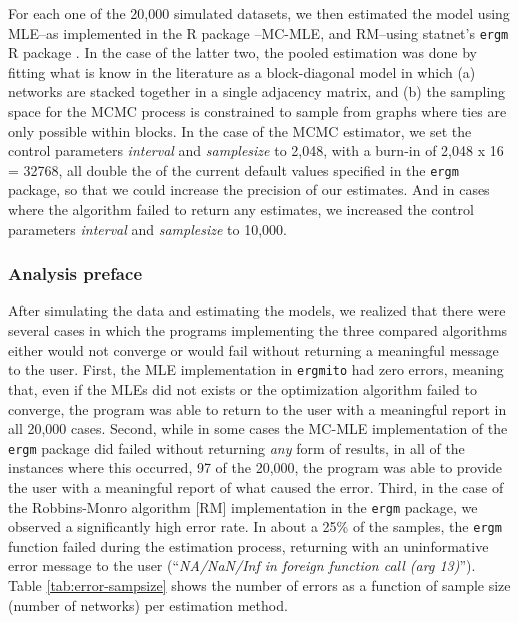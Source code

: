 \documentclass[review, nonatbib,doubleblind]{elsarticle/elsarticle}
\begin{document}
For each one of the 20,000 simulated datasets, we then estimated the model using MLE--as implemented in the \ergmito{} R package %
--MC-MLE, and RM--using statnet's \texttt{ergm} R package \cite{Handcock2018,hunter2008}. In the case of the latter two, the pooled estimation was done by fitting what is know in the literature as a block-diagonal model in which (a) networks are stacked together in a single adjacency matrix, and (b) the sampling space for the MCMC process is constrained to sample from graphs where ties are only possible within blocks. In the case of the MCMC estimator, we set the control parameters \textit{interval} and \textit{samplesize} to 2,048, with a burn-in of 2,048 x 16 = 32768, all double the of the current default values specified in the \texttt{ergm} package, so that we could increase the precision of our estimates. And in  cases where the algorithm failed to return any estimates, we increased the control parameters \textit{interval} and \textit{samplesize} to 10,000.

\subsubsection{Analysis preface}

After simulating the data and estimating the models, we realized that there were several cases in which the programs implementing the three compared algorithms either would not converge or would fail without returning a meaningful message to the user. First, the MLE implementation in \texttt{ergmito} had zero errors, meaning that, even if the MLEs did not exists or the optimization algorithm failed to converge, the program was able to return to the user with a meaningful report in all 20,000 cases. Second, while in some cases the MC-MLE implementation of the \texttt{ergm} package did failed without returning \textit{any} form of results, in all of the instances where this occurred, 97 of the 20,000, the program was able to provide the user with a meaningful report of what caused the error. Third, in the case of the Robbins-Monro algorithm [RM] implementation in the \texttt{ergm} package, we observed a significantly high error rate. In about a 25\% of the samples, the \texttt{ergm} function failed during the estimation process, returning with an uninformative error message to the user (``\textit{NA/NaN/Inf in foreign function call (arg 13)}''). Table \ref{tab:error-sampsize} shows the number of errors as a function of sample size (number of networks) per estimation method.
\end{document}
